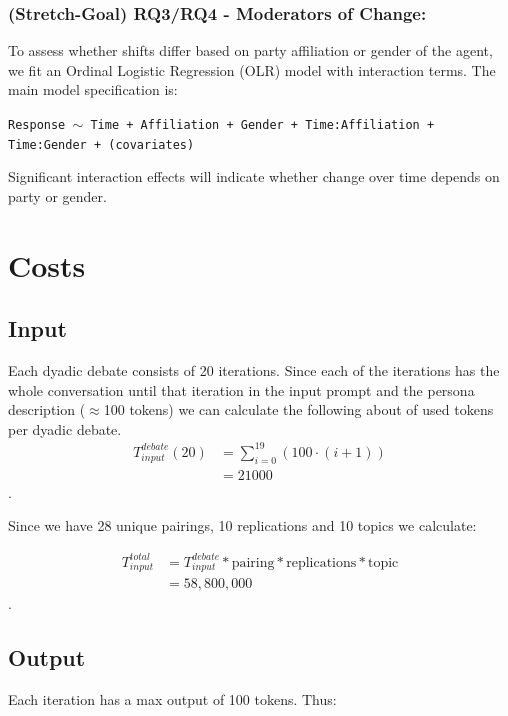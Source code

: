 \documentclass[12pt]{article}
\begin{document}
\begin{multicols}{2}
\subsubsection{(Stretch-Goal) RQ3/RQ4 - Moderators of Change:}
To assess whether shifts differ based on party affiliation or gender of the agent, we fit an Ordinal Logistic Regression (OLR) model with interaction terms. The main model specification is:

\texttt{Response $\sim$ Time + Affiliation + Gender + Time:Affiliation + Time:Gender + (covariates)}

Significant interaction effects will indicate whether change over time depends on party or gender.






\appendix




\section{Costs}

\subsection{Input}


Each dyadic debate consists of 20 iterations. Since each of the iterations has the whole conversation until that iteration in the input prompt and the persona description ($\approx$100 tokens) we can calculate the following about of used tokens per dyadic debate. 
\begin{align*}
    T^{debate}_{input}(20) &= \sum_{i=0}^{19} (100 \cdot (i+1)) \\ %
    &= 21000
\end{align*}.

Since we have 28 unique pairings, 10 replications and 10 topics we calculate:

\begin{align*}
    T^{total}_{input} &= T^{debate}_{input} * \text{pairing} *\text{replications} * \text{topic} \\
    &= 58{,}800{,}000
\end{align*}.

\subsection{Output}

Each iteration has a max output of 100 tokens. Thus:



\end{multicols}
\end{document}
